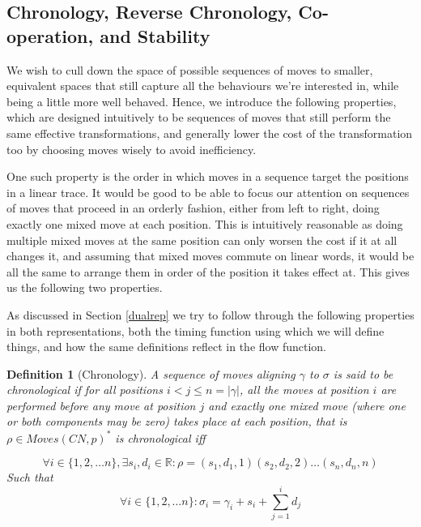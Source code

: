 \documentclass{article}
\theoremstyle{Definition}
\newtheorem{definition}{Definition}
\theoremstyle{definition}
\begin{document}
	\subsection{Chronology, Reverse Chronology, Co-operation, and Stability}	
	
	We wish to cull down the space of possible sequences of moves to smaller, equivalent spaces that still capture all the behaviours we're interested in, while being a little more well behaved. 
	Hence, we introduce the following properties, which are designed intuitively to be sequences of moves that still perform the same effective transformations, and generally lower the cost of the transformation too by choosing moves wisely to avoid inefficiency. 
	
	One such property is the order in which moves in a sequence target the positions in a linear trace. It would be good to be able to focus our attention on sequences of moves that proceed in an orderly fashion, either from left to right, doing exactly one mixed move at each position. This is intuitively reasonable as doing multiple mixed moves at the same position can only worsen the cost if it at all changes it, and assuming that mixed moves commute on linear words, it would be all the same to arrange them in order of the position it takes effect at. This gives us the following two properties. 
	
	As discussed in Section \ref{dualrep} we try to follow through the following properties in both representations, both the timing function using which we will define things, and how the same definitions reflect in the flow function. 
	
	\begin{definition}[Chronology]
		A sequence of moves aligning $\gamma$ to $\sigma$ is said to be \textit{chronological} if for all positions $i < j \leq n = |\gamma|$, all the moves at position $i$ are performed before any move at position $j$ and exactly one mixed move (where one or both components may be zero) takes place at each position, that is $\rho \in Moves(CN, p)^*$ is chronological iff  
		
		$$\forall i \in \{1, 2, \dots n\},  \exists s_i, d_i \in \mathbb{R} : \rho = (s_1, d_1, 1)(s_2, d_2, 2)\dots (s_n, d_n, n) $$
		Such that $$\forall i \in \{1, 2, \dots n\} : \sigma_i = \gamma_i + s_i + \sum_{j=1}^{i} d_j$$
		
	\end{definition}
\end{document}
